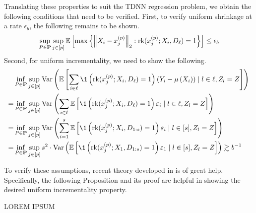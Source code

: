 Translating these properties to suit the TDNN regression problem, we obtain the following conditions that need to be verified.
First, to verify uniform shrinkage at a rate $\epsilon_b$, the following remains to be shown.
\begin{equation}
	\sup_{P \in \mathbf{P}} \sup_{j \in[p]}
	\mathbb{E}\left[\max \left\{\left\|X_{i}-x^{(p)}_{j}\right\|_{2}:
	\text{rk}(x^{(p)}_{j}; X_{i}, D_{\ell}) = 1\right\}\right]
	\leq \epsilon_b
\end{equation}
Second, for uniform incrementality, we need to show the following.
\begin{equation}
	\begin{aligned}
		  & \inf_{P \in \mathbf{P}} \sup_{j \in[p]}
		\Var\left(\E\left[
				\sum_{i \in \ell} \1\left(\rk(x^{(p)}_{j}; X_{i}, D_{\ell}) = 1\right) \left(Y_{i} - \mu\left(X_{i}\right)\right) \mid l \in \ell, Z_l = Z\right]
		\right)                                     \\
		= & \inf_{P \in \mathbf{P}} \sup_{j \in[p]}
		\Var\left(
		\sum_{i \in \ell}\E\left[\1\left(\rk(x^{(p)}_{j}; X_{i}, D_{\ell}) = 1\right) \varepsilon_i \mid l \in \ell, Z_l = Z\right]
		\right)                                     \\
		= & \inf_{P \in \mathbf{P}} \sup_{j \in[p]}
		\Var\left(
		\sum_{i = 1}^{s}\E\left[\1\left(\rk(x^{(p)}_{j}; X_{i}, D_{1:s}) = 1\right) \varepsilon_i \mid l \in [s], Z_l = Z\right]
		\right)                                     \\
		= & \inf_{P \in \mathbf{P}} \sup_{j \in[p]}
		s^2 \cdot \Var\left(
		\E\left[\1\left(\rk(x^{(p)}_{j}; X_1, D_{1:s}) = 1\right) \varepsilon_1 \mid l \in [s], Z_l = Z\right]
		\right)
		\gtrsim b^{-1}
	\end{aligned}
\end{equation}

To verify these assumptions, recent theory developed in \citet{peng_rates_2022} is of great help.
Specifically, the following Proposition and its proof are helpful in showing the desired uniform incrementality property.

	{\color{red} LOREM IPSUM}

